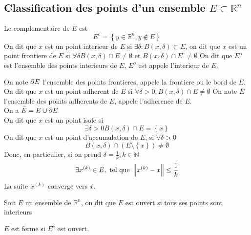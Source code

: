 \documentclass[../main.tex]{subfiles}
\begin{document}
\subsection{Classification des points d'un ensemble $E \subset \mathbb{R}^n$}
Le complementaire de $E$ est
\[ 
E^{c}= \left\{ y \in \mathbb{R}^n , y \notin E \right\} 
\]
On dit que $x$ est un point interieur de $E$ si $\exists \delta: B( x,\delta) \subset E$,
on dit que $x$ est un point frontiere de $E$ si $\forall \delta B( x,\delta) \cap E\neq \emptyset  $ et $B( x,\delta) \cap E^{c} \neq \emptyset $
On dit que $E^{o}$ est l'ensemble des points interieurs de $E$, $E^{o}$ est appele l'interieur de $E$.

On note $\partial E $ l'ensemble des points frontieres, appele la frontiere ou le bord de $E$.\\
On dit que $x$ est un point adherent de $E$ si $\forall \delta >0 ,B( x,\delta) \cap E \neq \emptyset $
On note $ \bar E$ l'ensemble des points adherents de $E$, appele l'adherence de $E$.\\
On a $\bar E = E \cup \partial E$ \\
On dit que $x$ est un point isole si 
\[ 
	\exists \delta>0 B( x,\delta) \cap E = \left\{ x \right\} 
\]
On dit que $x$ est un point d'accumulation de $E$, si  $\forall \delta>0$ 
\[ 
	B( x,\delta) \cap ( E\setminus \left\{ x \right\} ) \neq \emptyset 
\]
Donc, en particulier, si on prend $ \delta = \frac{1}{k},k \in \mathbb{N}$
\[ 
	\exists x^{( k) } \in E, \text{ tel que } \left\lVert x^{( k) }-x\right\rVert \leq \frac{1}{k}
\]
La suite $x^{( k) }$ converge vers $x$.
\begin{defn}
	Soit $E$ un ensemble de $ \mathbb{R}^n$, on dit que $E$ est ouvert si tous ses points sont interieurs
	
\end{defn}
\begin{defn}
	$E$ est ferme si $E^{c}$ est ouvert.
	
\end{defn}
\end{document}
